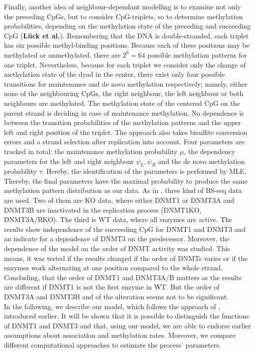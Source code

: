 Finally, another idea of neighbour-dependant modelling is to examine not only the preceding \acp{CpG}, but to consider \ac{CpG}-triplets, so to determine methylation probabilities, depending on the methylation state of the preceding and succeeding \ac{CpG} (\textbf{L\"{u}ck et al.}\cite{Lueck}). Remembering that the DNA is double-stranded, each triplet has six possible methyl-binding positions. Because each of these positions may be methylated or unmethylated, there are $2^6 = 64$ possible methylation patterns for one triplet. Nevertheless, because for each triplet we consider only the change of methylation state of the dyad in the center, there exist only four possible transitions for maintenance and de novo methylation respectively; namely, either none of the neighbouring \acp{CpG}, the right neighbour, the left neighbour or both neighbours are methylated. The methylation state of the centered \ac{CpG} on the parent strand is deciding in case of maintenance methylation. No dependence is between the transition probabilities of the methylation patterns and the upper left and right position of the triplet. The approach also takes bisulfite conversion errors and a strand selection after replication into account.\newline
Four parameters are tracked in total: the maintenance methylation probability $\mu$, the dependency parameters for the left and right neighbour $\psi_L, \psi_R$ and the de novo methylation probability $\tau$. Hereby, the identification of the parameters is performed by \ac{MLE}. Thereby, the final parameters have the maximal probability to produce the same methylation pattern distribution as our data.\newline
As in \cite{Wolf}, three kind of \ac{BS-seq} data are used. Two of them are \ac{KO} data, where either DNMT1 or DNMT3A and DNMT3B are inactivated in the replication process (DNMT1KO, DNMT3A/BKO). The third is \ac{WT} data, where all enzymes are active.\newline
The results show independence of the succeeding \ac{CpG} for DNMT1 and DNMT3 and an indicate for a dependence of DNMT3 on the predecessor. Moreover, the dependence of the model on the order of \ac{DNMT} activity was studied. This means, it was tested if the results changed if the order of \acp{DNMT} varies or if the enzymes work alternating at one position compared to the whole strand. Concluding, that the order of DNMT1 and DNMT3A/B matters as the results are different if DNMT1 is not the first enzyme in \ac{WT}. But the order of DNMT3A and DNMT3B and of the alteration seems not to be significant.\\

In the following, we describe our model, which follows the approach of \cite{Fu}, introduced earlier. It will be shown that it is possible to distinguish the functions of DNMT1 and DNMT3 and that, using our model, we are able to endorse earlier assumptions about association and methylation rates. Moreover, we compare different computational approaches to estimate the process' parameters.